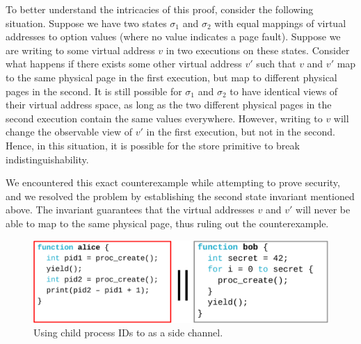To better understand the intricacies of this proof, consider the
following situation. Suppose we have two states $\sigma_1$ and
$\sigma_2$ with equal mappings of virtual addresses to option values
(where no value indicates a page fault). Suppose we are writing
to some virtual address $v$ in two executions on these states.
Consider what happens if there exists some other virtual address
$v'$ such that $v$ and $v'$ map to the same physical page
in the first execution, but map to different physical pages in
the second. It is still possible for $\sigma_1$ and $\sigma_2$
to have identical views of their virtual address space, as long
as the two different physical pages in the second execution
contain the same values everywhere. However, writing to $v$
will change the observable view of $v'$ in the first execution,
but not in the second. Hence, in this situation, it is possible
for the store primitive to break indistinguishability.

We encountered this exact counterexample while attempting to
prove security, and we resolved the problem by establishing
the second state invariant mentioned above. The invariant
guarantees that the virtual addresses $v$ and $v'$ will never 
be able to map to the same physical page, thus ruling
out the counterexample.

\begin{figure}[t]
\begin{center}
\includegraphics[scale=0.55]{pldi/figure/spawnleak}
\caption{\small Using child process IDs to as a side channel.}
\label{fig:proccreate-leak}
\end{center}
\end{figure}

